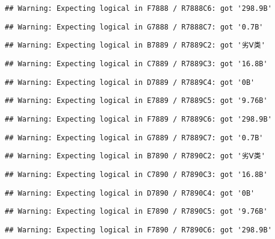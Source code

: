 \documentclass[
]{article}
\begin{document}
\begin{verbatim}
## Warning: Expecting logical in F7888 / R7888C6: got '298.9B'
\end{verbatim}

\begin{verbatim}
## Warning: Expecting logical in G7888 / R7888C7: got '0.7B'
\end{verbatim}

\begin{verbatim}
## Warning: Expecting logical in B7889 / R7889C2: got '劣Ⅴ类'
\end{verbatim}

\begin{verbatim}
## Warning: Expecting logical in C7889 / R7889C3: got '16.8B'
\end{verbatim}

\begin{verbatim}
## Warning: Expecting logical in D7889 / R7889C4: got '0B'
\end{verbatim}

\begin{verbatim}
## Warning: Expecting logical in E7889 / R7889C5: got '9.76B'
\end{verbatim}

\begin{verbatim}
## Warning: Expecting logical in F7889 / R7889C6: got '298.9B'
\end{verbatim}

\begin{verbatim}
## Warning: Expecting logical in G7889 / R7889C7: got '0.7B'
\end{verbatim}

\begin{verbatim}
## Warning: Expecting logical in B7890 / R7890C2: got '劣Ⅴ类'
\end{verbatim}

\begin{verbatim}
## Warning: Expecting logical in C7890 / R7890C3: got '16.8B'
\end{verbatim}

\begin{verbatim}
## Warning: Expecting logical in D7890 / R7890C4: got '0B'
\end{verbatim}

\begin{verbatim}
## Warning: Expecting logical in E7890 / R7890C5: got '9.76B'
\end{verbatim}

\begin{verbatim}
## Warning: Expecting logical in F7890 / R7890C6: got '298.9B'
\end{verbatim}
\end{document}
